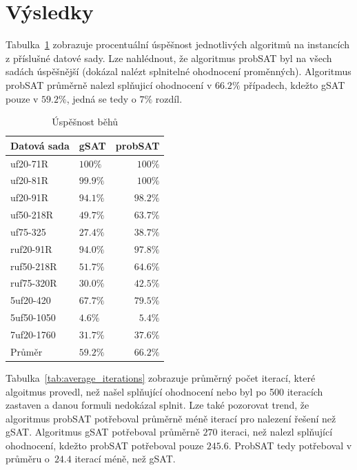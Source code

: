 \documentclass[twoside,twocolumn]{article}
\begin{document}


    \section{Výsledky}


    Tabulka~\ref{tab:success_ratio} zobrazuje procentuální úspěšnost jednotlivých algoritmů na instancích z příslušné datové sady.
    Lze nahlédnout, že algoritmus probSAT byl na všech sadách úspěšnější (dokázal nalézt splnitelné ohodnocení proměnných).
    Algoritmus probSAT průměrně nalezl splňujicí ohodnocení v $66.2\%$ případech, kdežto gSAT pouze v $59.2\%$, jedná se tedy o $7\%$ rozdíl.


    \begin{table}
        \caption{Úspěšnost běhů}
        \centering
        \begin{tabular}{llr}
            \toprule
            Datová sada & gSAT     & probSAT  \\
            \midrule
            uf20-71R    & $100\%$  & $100\%$  \\
            uf20-81R    & $99.9\%$ & $100\%$  \\
            uf20-91R    & $94.1\%$ & $98.2\%$ \\
            uf50-218R   & $49.7\%$ & $63.7\%$ \\
            uf75-325    & $27.4\%$ & $38.7\%$ \\
            ruf20-91R   & $94.0\%$ & $97.8\%$ \\
            ruf50-218R  & $51.7\%$ & $64.6\%$ \\
            ruf75-320R  & $30.0\%$ & $42.5\%$ \\
            5uf20-420   & $67.7\%$ & $79.5\%$ \\
            5uf50-1050  & $4.6\%$  & $5.4\%$  \\
            7uf20-1760  & $31.7\%$ & $37.6\%$ \\
            \midrule
            Průměr      & $59.2\%$ & $66.2\%$ \\
            \bottomrule
        \end{tabular}
        \label{tab:success_ratio}
    \end{table}

    Tabulka~\ref{tab:average_iterations} zobrazuje průměrný počet iterací, které algoitmus provedl, než našel splňující
    ohodnocení nebo byl po 500 iteracích zastaven a danou formuli nedokázal splnit.
    Lze také pozorovat trend, že algoritmus probSAT potřeboval průměrně méně iterací pro nalezení řešení než gSAT\@.
    Algoritmus gSAT potřeboval průměrně $270$ iteraci, než nalezl splňující ohodnocení, kdežto probSAT potřeboval pouze $245.6$.
    ProbSAT tedy potřeboval v průměru o~$24.4$ iterací méně, než gSAT\@.
\end{document}
